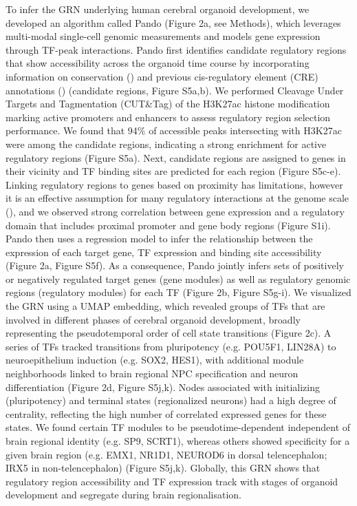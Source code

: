 To infer the GRN underlying human cerebral organoid development, we developed an algorithm called Pando (Figure 2a, see Methods), which leverages multi-modal single-cell genomic measurements and models gene expression through TF-peak interactions. Pando first identifies candidate regulatory regions that show accessibility across the organoid time course by incorporating information on conservation (\cite{siepel_evolutionarily_2005}) and previous cis-regulatory element (CRE) annotations (\cite{encode_project_consortium_expanded_2020}) (candidate regions, Figure S5a,b). We performed Cleavage Under Targets and Tagmentation (CUT\&Tag) of the H3K27ac histone modification marking active promoters and enhancers to assess regulatory region selection performance. We found that 94\% of accessible peaks intersecting with H3K27ac were among the candidate regions, indicating a strong enrichment for active regulatory regions (Figure S5a). Next, candidate regions are assigned to genes in their vicinity and TF binding sites are predicted for each region (Figure S5c-e). Linking regulatory regions to genes based on proximity has limitations, however it is an effective assumption for many regulatory interactions at the genome scale (\cite{mclean_great_2010,aibar_scenic_2017}), and we observed strong correlation between gene expression and a regulatory domain that includes proximal promoter and gene body regions (Figure S1i). Pando then uses a regression model to infer the relationship between the expression of each target gene, TF expression and binding site accessibility (Figure 2a, Figure S5f). As a consequence, Pando jointly infers sets of positively or negatively regulated target genes (gene modules) as well as regulatory genomic regions (regulatory modules) for each TF (Figure 2b, Figure S5g-i). We visualized the GRN using a UMAP embedding, which revealed groups of TFs that are involved in different phases of cerebral organoid development, broadly representing the pseudotemporal order of cell state transitions (Figure 2c). A series of TFs tracked transitions from pluripotency (e.g. POU5F1, LIN28A) to neuroepithelium induction (e.g. SOX2, HES1), with additional module neighborhoods linked to brain regional NPC specification and neuron differentiation (Figure 2d, Figure S5j,k). Nodes associated with initializing (pluripotency) and terminal states (regionalized neurons) had a high degree of centrality, reflecting the high number of correlated expressed genes for these states. We found certain TF modules to be pseudotime-dependent independent of brain regional identity (e.g. SP9, SCRT1), whereas others showed specificity for a given brain region (e.g. EMX1, NR1D1, NEUROD6 in dorsal telencephalon; IRX5 in non-telencephalon) (Figure S5j,k). Globally, this GRN shows that regulatory region accessibility and TF expression track with stages of organoid development and segregate during brain regionalisation.

